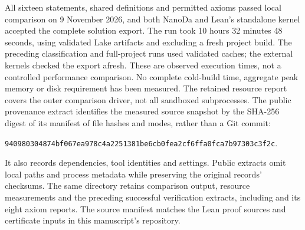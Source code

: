 All sixteen statements, shared definitions and permitted axioms passed local
comparison on 9 November 2026, and both NanoDa and Lean's standalone kernel
accepted the complete solution export. The run took 10 hours 32 minutes
48 seconds, using validated Lake artifacts and excluding a fresh project build.
The preceding classification and full-project runs used validated caches;
the external kernels checked the export afresh. These are observed execution
times, not a controlled performance comparison.
No complete cold-build time, aggregate peak memory or disk requirement has
been measured. The retained resource report covers the outer comparison
driver, not all sandboxed subprocesses.
The public provenance extract 
identifies the measured source snapshot by the SHA-256 digest of its manifest of file hashes
and modes, rather than a Git commit:
\begin{center}\small\texttt{940980304874bf067ea978c4a2251381be6cb0fea2cf6ffa0fca7b97303c3f2c}.\end{center}
It also records dependencies, tool identities and settings. Public extracts
omit local paths and process metadata while preserving the original records'
checksums. The same directory retains comparison output, resource measurements
and the preceding successful verification extracts, including
 and its eight axiom reports.
The source manifest matches the Lean proof sources and certificate inputs
in this manuscript's repository.
